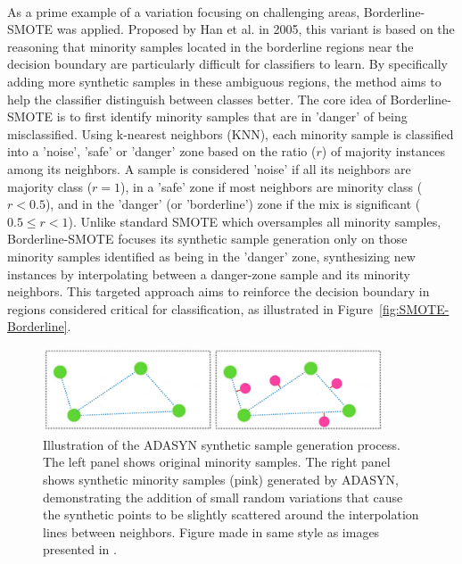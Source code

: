 \documentclass[12pt,a4paper]{report}
\begin{document}
\\
\noindent
As a prime example of a variation focusing on challenging areas, Borderline-SMOTE \cite{Han2005Borderline} was applied. Proposed by Han et al. in 2005, this variant is based on the reasoning that minority samples located in the borderline regions near the decision boundary are particularly difficult for classifiers to learn. By specifically adding more synthetic samples in these ambiguous regions, the method aims to help the classifier distinguish between classes better. The core idea of Borderline-SMOTE is to first identify minority samples that are in 'danger' of being misclassified. Using k-nearest neighbors (KNN), each minority sample is classified into a 'noise', 'safe' or 'danger' zone based on the ratio ($r$) of majority instances among its neighbors. A sample is considered 'noise' if all its neighbors are majority class ($r=1$), in a 'safe' zone if most neighbors are minority class ($r < 0.5$), and in the 'danger' (or 'borderline') zone if the mix is significant ($0.5 \leq r < 1$). Unlike standard SMOTE which oversamples all minority samples, Borderline-SMOTE focuses its synthetic sample generation only on those minority samples identified as being in the 'danger' zone, synthesizing new instances by interpolating between a danger-zone sample and its minority neighbors. This targeted approach aims to reinforce the decision boundary in regions considered critical for classification, as illustrated in Figure~\ref{fig:SMOTE-Borderline}.\\
\begin{figure}[h!]
  \centering
  \includegraphics[width=0.9\textwidth]{images/SMOTE-ADASYN.png}
  \caption[Illustration of ADASYN Sample Generation]{Illustration of the ADASYN synthetic sample generation process. The left panel shows original minority samples. The right panel shows synthetic minority samples (pink) generated by ADASYN, demonstrating the addition of small random variations that cause the synthetic points to be slightly scattered around the interpolation lines between neighbors. Figure made in same style as images presented in \cite{Truong2022SMOTEVariants}.}
  \label{fig:SMOTE-ADASYN}
\end{figure}
\\
\end{document}
